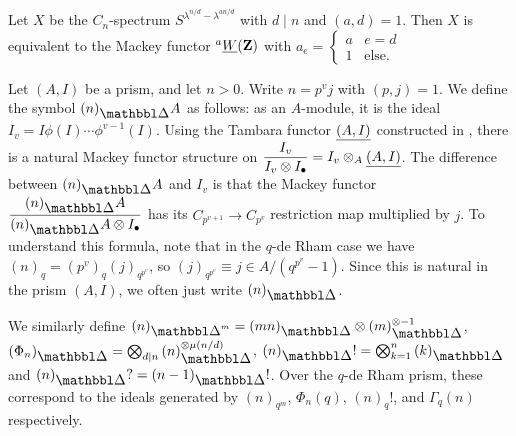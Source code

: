 \begin{theorem}
  Let $X$ be the $C_n$-spectrum $S^{\lambda^{n/d} - \lambda^{an/d}}$ with $d\mid n$ and $(a,d)=1$. Then $X$ is equivalent to the Mackey functor ${}^{a} \underline W(\mathbf Z)$ with $a_e=\begin{cases}a&e=d\\ 1&\text{else.}\end{cases}$
\end{theorem}

\begin{definition}
  \label{dfn:prismatic-factorial}
  Let $(A, I)$ be a prism, and let $n>0$. Write $n = p^v j$ with $(p,j)=1$. We define the symbol $(n)_\prism A$ as follows: as an $A$-module, it is the ideal $I_v = I \phi(I) \dotsm \phi^{v-1}(I)$. Using the Tambara functor $\underline{(A, I)}$ constructed in \cite{PrismsTambara1}, there is a natural Mackey functor structure on $\dfrac{I_v}{I_v \otimes I_\bullet} = I_v \otimes_A \underline{(A, I)}$. The difference between $(n)_\prism A$ and $I_v$ is that the Mackey functor $\dfrac{(n)_\prism A}{(n)_\prism A \tnsr I_\bullet}$ has its $C_{p^{v+1}} \to C_{p^v}$ restriction map multiplied by $j$. To understand this formula, note that in the $q$-de Rham case we have $(n)_q = (p^v)_q (j)_{q^{p^v}}$, so $(j)_{q^{p^v}} \equiv j \in A/(q^{p^v}-1)$. Since this is natural in the prism $(A, I)$, we often just write $(n)_\prism$.

  We similarly define $(n)_{\prism^m} = (mn)_\prism \tnsr (m)_\prism^{\tnsr -1}$, $(\Phi_n)_\prism = \bigotimes_{d\mid n} {(n)_\prism ^{\tnsr\mu(n/d)}}$, $(n)_\prism! = \bigotimes_{k=1}^n {(k)_\prism}$ and $(n)_\prism? = (n-1)_\prism!$.
  Over the $q$-de Rham prism, these correspond to the ideals generated by $(n)_{q^m}$, $\Phi_n(q)$, $(n)_q!$, and $\Gamma_q(n)$ respectively.
\end{definition}


